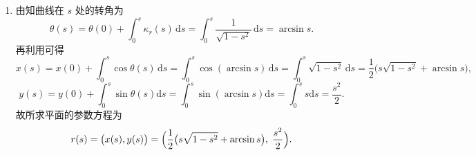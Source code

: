 \documentclass[../../main.tex]{subfiles}%
\begin{document}
\begin{solution}
\begin{enumerate}[(1)]
\item 由知曲线在 \(s\) 处的转角为
\[
\theta(s)=\theta(0)+\int_0^s\kappa_r(s)\,\mathrm{d}s=\int_0^s\frac{1}{\sqrt{1-s^2}}\,\mathrm{d}s=\arcsin s.
\]
再利用可得
\[
x(s)=x(0)+\int_0^s\cos\theta(s)\,\mathrm{d}s=\int_0^s\cos(\arcsin s)\,\mathrm{d}s=\int_0^s\sqrt{1-s^2}\,\mathrm{d}s=\frac{1}{2}\bigl(s\sqrt{1-s^2}+\arcsin s\bigr),
\]
\[
y\left( s \right) =y\left( 0 \right) +\int_0^s{\sin \theta \left( s \right) \mathrm{d}s}=\int_0^s{\sin \left( \arcsin s \right) \mathrm{d}s}=\int_0^s{s\mathrm{d}s}=\frac{s^2}{2}.
\]
故所求平面的参数方程为
\[
r(s)=\bigl(x(s),y(s)\bigr)=\Bigl(\frac{1}{2}\bigl(s\sqrt{1-s^2}+\arcsin s\bigr),\;\frac{s^2}{2}\Bigr).
\]
\end{enumerate}

\end{solution}
\end{document}
